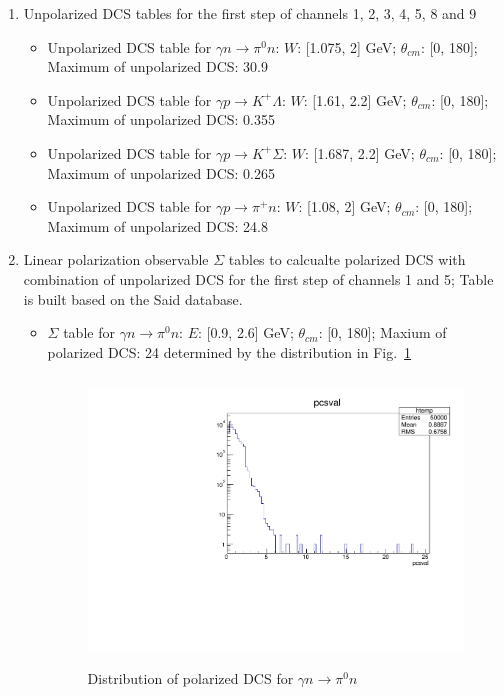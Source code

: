 \documentclass[a4paper]{article}
\begin{document}
\begin{enumerate}
\item Unpolarized DCS tables for the first step of channels 1, 2, 3, 4, 5, 8 and 9
 \begin{itemize}
  \item Unpolarized DCS table for $\gamma n\rightarrow\pi^0 n$: $W$: [1.075, 2] GeV; $\theta_{cm}$: [0, 180]; Maximum of unpolarized DCS: 30.9
  \item Unpolarized DCS table for $\gamma p\rightarrow K^+\Lambda$: $W$: [1.61, 2.2] GeV; $\theta_{cm}$: [0, 180]; Maximum of unpolarized DCS: 0.355
  \item Unpolarized DCS table for $\gamma p\rightarrow K^+\Sigma$: $W$: [1.687, 2.2] GeV; $\theta_{cm}$: [0, 180]; Maximum of unpolarized DCS: 0.265
  \item Unpolarized DCS table for $\gamma p\rightarrow\pi^+ n$: $W$: [1.08, 2] GeV; $\theta_{cm}$: [0, 180]; Maximum of unpolarized DCS: 24.8
  \end{itemize}

\item Linear polarization observable $\Sigma$ tables to calcualte polarized DCS with combination of unpolarized DCS for the first step of channels 1 and 5; Table is built based on the Said database.
 \begin{itemize}
  \item $\Sigma$ table for $\gamma n\rightarrow\pi^0 n$: $E$: [0.9, 2.6] GeV; $\theta_{cm}$: [0, 180]; Maxium of polarized DCS: 24 determined by the distribution in Fig.~\ref{pdcs-value-pi0}

\begin{figure}[H]
   \begin{center}
   \includegraphics[width=6in,height=3in]{pdcs-value-pi0.pdf} 
   \caption[]{Distribution of polarized DCS for $\gamma n\rightarrow\pi^0 n$}      \label{pdcs-value-pi0}
   \end{center}
\end{figure}


\end{itemize}
\end{enumerate}
\end{document}
